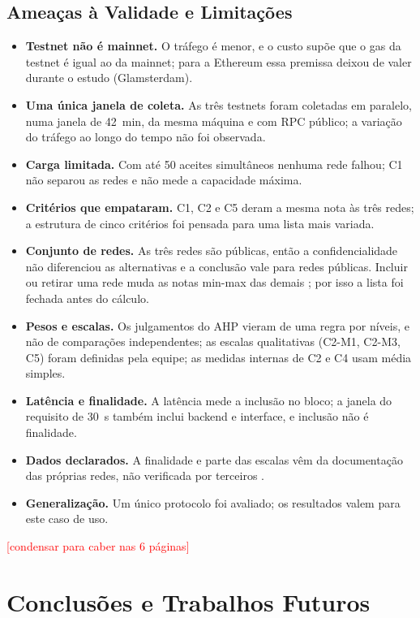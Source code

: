 \documentclass[10pt,a4paper]{article}
\newcommand{\pendente}[1]{\textcolor{red}{[#1]}}
\begin{document}
\subsection{Ameaças à Validade e Limitações}\label{sec:ameacas}

\begin{itemize}
\item \textbf{Testnet não é mainnet.} O tráfego é menor, e o custo supõe que o gas da testnet é igual ao da mainnet; para a Ethereum essa premissa deixou de valer durante o estudo (Glamsterdam).
\item \textbf{Uma única janela de coleta.} As três testnets foram coletadas em paralelo, numa janela de 42~min, da mesma máquina e com RPC público; a variação do tráfego ao longo do tempo não foi observada.
\item \textbf{Carga limitada.} Com até 50 aceites simultâneos nenhuma rede falhou; C1 não separou as redes e não mede a capacidade máxima.
\item \textbf{Critérios que empataram.} C1, C2 e C5 deram a mesma nota às três redes; a estrutura de cinco critérios foi pensada para uma lista mais variada.
\item \textbf{Conjunto de redes.} As três redes são públicas, então a confidencialidade não diferenciou as alternativas e a conclusão vale para redes públicas. Incluir ou retirar uma rede muda as notas min-max das demais \cite{belton1983}; por isso a lista foi fechada antes do cálculo.
\item \textbf{Pesos e escalas.} Os julgamentos do AHP vieram de uma regra por níveis, e não de comparações independentes; as escalas qualitativas (C2-M1, C2-M3, C5) foram definidas pela equipe; as medidas internas de C2 e C4 usam média simples.
\item \textbf{Latência e finalidade.} A latência mede a inclusão no bloco; a janela do requisito de 30~s também inclui backend e interface, e inclusão não é finalidade.
\item \textbf{Dados declarados.} A finalidade e parte das escalas vêm da documentação das próprias redes, não verificada por terceiros \cite{gramoli2023}.
\item \textbf{Generalização.} Um único protocolo foi avaliado; os resultados valem para este caso de uso.
\end{itemize}
\pendente{condensar para caber nas 6 páginas}

\section{Conclusões e Trabalhos Futuros}\label{sec:conclusao}
\end{document}
